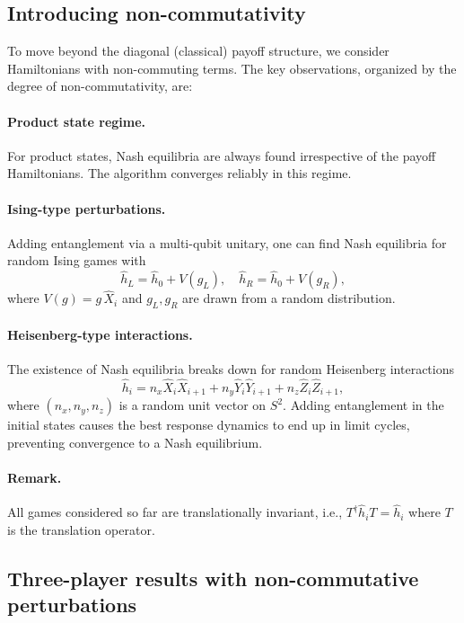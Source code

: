 \documentclass[12pt]{article}
\begin{document}
\subsection{Introducing non-commutativity}

To move beyond the diagonal (classical) payoff structure, we consider Hamiltonians
with non-commuting terms. The key observations, organized by the degree of non-commutativity, are:

\paragraph{Product state regime.}
For product states, Nash equilibria are always found irrespective of the payoff Hamiltonians.
The algorithm converges reliably in this regime.

\paragraph{Ising-type perturbations.}
Adding entanglement via a multi-qubit unitary, one can find Nash equilibria
for random Ising games with
\begin{equation}
    \hat{h}_L = \hat{h}_0 + V(g_L), \quad \hat{h}_R = \hat{h}_0 + V(g_R),
\end{equation}
where $V(g) = g\, \hat{X}_i$ and $g_L, g_R$ are drawn from a random distribution.

\paragraph{Heisenberg-type interactions.}
The existence of Nash equilibria breaks down for random Heisenberg interactions
\begin{equation}
    \hat{h}_i = n_x \hat{X}_i \hat{X}_{i+1} + n_y \hat{Y}_i \hat{Y}_{i+1} + n_z \hat{Z}_i \hat{Z}_{i+1},
\end{equation}
where $(n_x, n_y, n_z)$ is a random unit vector on $S^2$.
Adding entanglement in the initial states causes the best response dynamics to end up in limit cycles,
preventing convergence to a Nash equilibrium.

\paragraph{Remark.}
All games considered so far are translationally invariant, i.e.,
$T^\dagger \hat{h}_i T = \hat{h}_i$ where $T$ is the translation operator.

\subsection{Three-player results with non-commutative perturbations}
\end{document}
